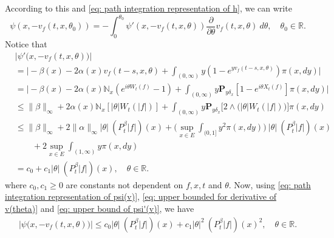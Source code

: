 \documentclass[12pt, a4paper]{amsart}
\theoremstyle{definition}
\numberwithin{equation}{section}
\begin{document}
    According to this and \eqref{eq: path integration representation of h}, we can write
\begin{equation}
\label{eq: path integration representation of psi(v)}
    \psi(x,-v_f(t,x,\theta_0)) = -\int_0^{\theta_0} \psi'(x,-v_f(t,x,\theta)) \frac{\partial}{\partial \theta} v_f(t,x,\theta)~d\theta,
    \quad \theta_0 \in \mathbb R.
\end{equation}
    Notice that
\begin{align}
\label{eq: upper bound of psi'(v)}
    &\big|\psi'\big(x, -v_f(t,x,\theta)\big)\big|
    \\&= \Big| -\beta(x)- 2\alpha(x) v_f(t-s,x,\theta) + \int_{(0,\infty)} y (1- e^{y v_f(t-s,x,\theta)} ) \pi(x,dy)\Big|
    \\&= \Big| - \beta(x)- 2\alpha(x)\mathbb N_x(e^{i\theta W_{t}(f)} - 1)  + \int_{(0,\infty)} y \mathbf P_{y \delta_x}[1-e^{i\theta X_{t}(f)}] \pi(x,dy) \Big|
\\ &\leq \|\beta\|_\infty + 2\alpha(x)\mathbb N_x[|\theta| W_t(|f|)]+ \int_{(0,\infty)} y\mathbf P_{y\delta_x}\big[2\wedge\big(|\theta| W_t(|f|)\big)\big] \pi(x,dy)
\\ &\leq \|\beta\|_\infty + 2\|\alpha\|_\infty  |\theta|~ (P^\beta_t |f|)(x) + \Big(\sup_{x\in E}\int_{(0,1]}y^2 \pi(x,dy)\Big)~ |\theta| ~(P^\beta_t |f|)(x)
\\ & \qquad + 2\sup_{x\in E}\int_{(1,\infty)} y \pi(x,dy)
\\ &= c_0 +c_1 |\theta| ~(P^\beta_t |f|)(x),
\quad \theta \in \mathbb R.
\end{align}
    where $c_0,c_1 \geq 0$ are constants not dependent on $f,x,t$ and $\theta$.
    Now, using \eqref{eq: path integration representation of psi(v)}, \eqref{eq: upper bounded for derivative of v(theta)} and \eqref{eq: upper bound of psi'(v)}, we have
\begin{align}
\label{eq: upper bound of psi(v)}
    \big|\psi\big(x,-v_f(t,x,\theta)\big)\big|
    \leq c_0|\theta|~(P^\beta_t |f|)(x)+c_1 |\theta|^2 ~(P^\beta_t |f|)(x)^2,
    \quad \theta \in \mathbb R.
\end{align}
\end{document}

